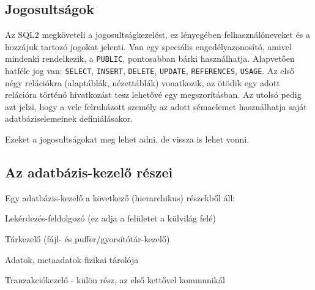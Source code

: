 \documentclass[fleqn,10pt,a4paper]{article}
\theoremstyle{magyar}
\begin{document}
  \subsection{Jogosultságok}
  Az SQL2 megköveteli a jogosultságkezelést, ez lényegében felhasználóneveket és a hozzájuk tartozó jogokat jelenti. Van
  egy speciális engedélyazonosító, amivel mindenki rendelkezik, a \texttt{PUBLIC}, pontosabban bárki
  használhatja. Alapvetően hatféle jog van: \texttt{SELECT}, \texttt{INSERT}, \texttt{DELETE}, \texttt{UPDATE},
  \texttt{REFERENCES}, \texttt{USAGE}. Az első négy relációkra (alaptáblák, nézettáblák) vonatkozik, az ötödik egy adott
  relációra történő hivatkozást tesz lehetővé egy megszorításban. Az utolsó pedig azt jelzi, hogy a vele felruházott
  személy az adott sémaelemet használhatja saját adatbáziselemeinek definiálásakor.
  
  Ezeket a jogosultságokat meg lehet adni, de vissza is lehet vonni.


  \subsection{Az adatbázis-kezelő részei}
  Egy adatbázis-kezelő a következő (hierarchikus) részekből áll:
  \begin{compactitem}
  \item Lekérdezés-feldolgozó (ez adja a felületet a külvilág felé)
  \item Tárkezelő (fájl- és puffer/gyorsítótár-kezelő)
  \item Adatok, metaadatok fizikai tárolója
  \item Tranzakciókezelő - külön rész, az első kettővel kommunikál
  \end{compactitem}
  
\end{document}
